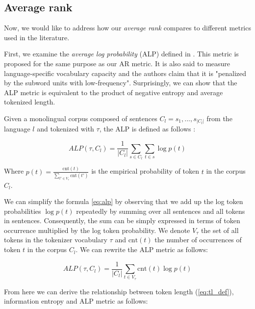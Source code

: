 \subsection{Average rank}

Now, we would like to address how our \textit{average rank} compares to different metrics used in the literature. 

First, we examine the \textit{average log probability} (ALP) defined in \citet{zheng_allocating_2021}. This metric is proposed for the same purpose as our AR metric. It is also said to measure language-specific vocabulary capacity and the authors claim that it is "penalized by the subword units with low-frequency". Surprisingly, we can show that the ALP metric is equivalent to the product of negative entropy and average tokenized length.

Given a monolingual corpus composed of sentences $C_l = {s_1, ..., s_{|C_l|}}$ from the language $l$ and tokenized with $\tau$, the ALP is defined as follows \cite{zheng_allocating_2021}:

\begin{equation}
\label{eq:alp}
    ALP(\tau, C_l) = \frac{1}{|C_l|} \sum_{s \in C_l} \sum_{t \in s} \log p(t)
\end{equation}

Where $p(t) = \frac{\mathrm{cnt}(t)}{\sum_{t' \in V_\tau} \mathrm{cnt}(t')}$ is the empirical probability of token $t$ in the corpus $C_l$. 


We can simplify the formula \autoref{eq:alp} by observing that we add up the log token probabilities $\log p(t)$ repeatedly by summing over all sentences and all tokens in sentences. Consequently, the sum can be simply expressed in terms of token occurrence multiplied by the log token probability. We denote $V_\tau$ the set of all tokens in the tokenizer vocabulary $\tau$ and $\mathrm{cnt}(t)$ the number of occurrences of token $t$ in the corpus $C_l$. We can rewrite the ALP metric as follows:

\begin{equation}
    ALP(\tau, C_l) = \frac{1}{|C_l|} \sum_{t \in V_\tau} \mathrm{cnt}(t) \log p(t)
\end{equation}

From here we can derive the relationship between token length (\autoref{eq:tl_def}), information entropy and ALP metric as follows:

